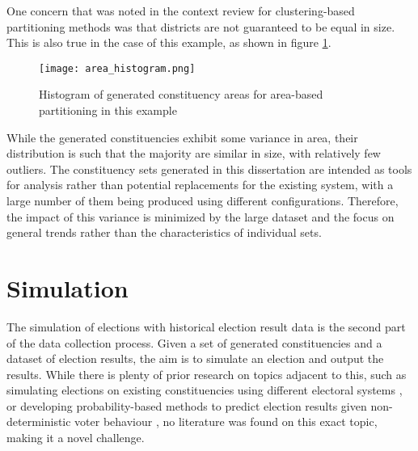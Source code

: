 \documentclass{article}
\begin{document}
One concern that was noted in the context review for clustering-based partitioning methods was that districts are not guaranteed to be equal in size. This is also
true in the case of this example, as shown in figure \ref{fig:area_histogram}.

\begin{figure}[H]
    \centering
    \texttt{[image: area\_histogram.png]}
    \caption{Histogram of generated constituency areas for area-based partitioning in this example}
    \label{fig:area_histogram}
\end{figure}

While the generated constituencies exhibit some variance in area, their distribution is such that the majority are similar in size, with relatively few outliers.
The constituency sets generated in this dissertation are intended as tools for analysis rather than potential replacements for the existing system, with a large
number of them being produced using different configurations. Therefore, the impact of this variance is minimized by the large dataset and the focus on general trends
rather than the characteristics of individual sets.


\section{Simulation}

The simulation of elections with historical election result data is the second part of the data collection process. Given a set of generated constituencies and a dataset of election results,
the aim is to simulate an election and output the results. While there is plenty of prior research on topics adjacent to this, such as simulating elections on existing constituencies using different 
electoral systems \cite{totalrepresentation}, or developing probability-based methods to predict election results given non-deterministic voter behaviour \cite{mitra2023evaluatingdistrictbasedelectionsurveys},
no literature was found on this exact topic, making it a novel challenge.
\end{document}
